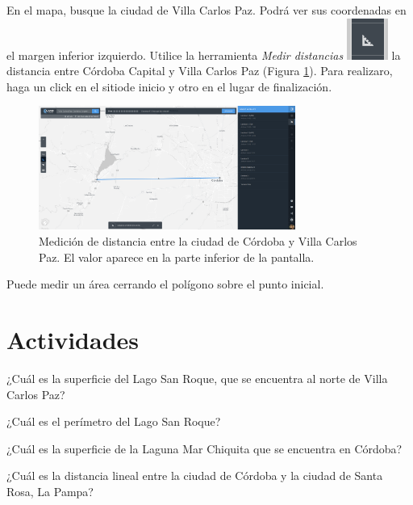 \documentclass[a4paper,12pt]{book}
\begin{document}
En el mapa, busque la ciudad de Villa Carlos Paz. Podrá ver sus coordenadas en el margen inferior izquierdo. Utilice la herramienta \emph{Medir distancias} \includegraphics[scale=0.2]{in:medir.png} la distancia entre Córdoba Capital y Villa Carlos Paz (Figura \ref{fig:distancia}). Para realizaro, haga un click en el sitiode inicio y otro en el lugar de finalización.

\begin{figure}[!h]
    \centering
    \includegraphics[width=0.75\textwidth]{fig:distancia.png}
    \caption{Medición de distancia entre la ciudad de Córdoba y Villa Carlos Paz. El valor aparece en la parte inferior de la pantalla.}
    \label{fig:distancia}
\end{figure}

Puede medir un área cerrando el polígono sobre el punto inicial.

\section{Actividades}

\begin{que}
    ¿Cuál es la superficie del Lago San Roque, que se encuentra al norte de Villa Carlos Paz?
\end{que}
\begin{que}
    ¿Cuál es el perímetro del Lago San Roque?
\end{que}
\begin{que}
    ¿Cuál es la superficie de la Laguna Mar Chiquita que se encuentra en Córdoba?
\end{que}

\begin{que}
    ¿Cuál es la distancia lineal entre la ciudad de Córdoba y la ciudad de Santa Rosa, La Pampa?
\end{que}
\end{document}
